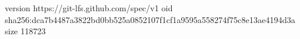 version https://git-lfs.github.com/spec/v1
oid sha256:dca7b4487a3822bd0bb525a0852107f1cf1a9595a558274f75c8e13ae4194d3a
size 118723
